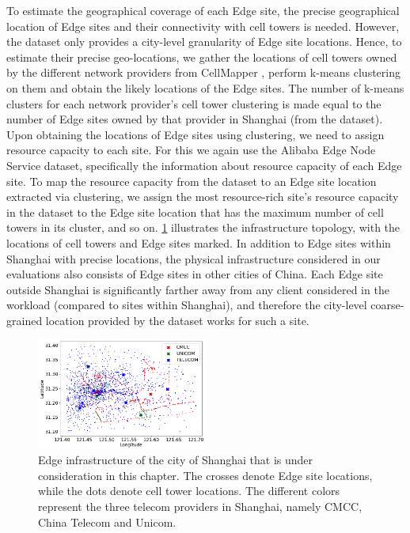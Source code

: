 To estimate the geographical coverage of each Edge site, the precise geographical location of Edge sites and their connectivity with cell towers is needed. However, the dataset only provides a city-level granularity of Edge site locations. Hence, to estimate their precise geo-locations, we gather the locations of cell towers owned by the different network providers from CellMapper \cite{cellmapper}, perform k-means clustering on them and obtain the likely locations of the Edge sites. The number of k-means clusters for each network provider's cell tower clustering is made equal to the number of Edge sites owned by that provider in Shanghai (from the dataset). Upon obtaining the locations of Edge sites using clustering, we need to assign resource capacity to each site. For this we again use the Alibaba Edge Node Service dataset, specifically the information about resource capacity of each Edge site. To map the resource capacity from the dataset to an Edge site location extracted via clustering, we assign the most resource-rich site's resource capacity in the dataset to the Edge site location that has the maximum number of cell towers in its cluster, and so on. \cref{fig:shanghai_infra} illustrates the infrastructure topology, with the locations of cell towers and Edge sites marked. In addition to Edge sites within Shanghai with precise locations, the physical infrastructure considered in our evaluations also consists of Edge sites in other cities of China. Each Edge site outside Shanghai is significantly farther away from any client considered in the workload (compared to sites within Shanghai), and therefore the city-level coarse-grained location provided by the dataset works for such a site.
\begin{figure}
\centering
\includegraphics[width=0.5\textwidth]{figures/mechanisms/infrastructure.png}
\caption{Edge infrastructure of the city of Shanghai that is under consideration in this chapter. The crosses denote Edge site locations, while the dots denote cell tower locations. The different colors represent the three telecom providers in Shanghai, namely CMCC, China Telecom and Unicom.}
\label{fig:shanghai_infra}
\end{figure}

